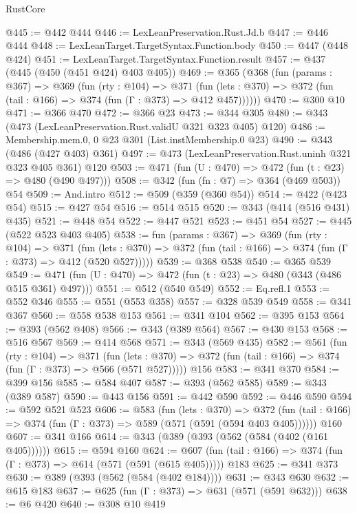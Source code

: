 \begin{lexlean}{RustCore}
\begin{coremodule}
@445 := @442 @444
@446 := LexLeanPreservation.Rust.Jd.b
@447 := @446 @444
@448 := LexLeanTarget.TargetSyntax.Function.body
@450 := @447 (@448 @424)
@451 := LexLeanTarget.TargetSyntax.Function.result
@457 := @437 (@445 (@450 (@451 @424) @403 @405))
@469 := @365
    (@368
      (fun (params : @367) =>
      @369
        (fun (rty : @104) =>
        @371
          (fun (lets : @370) => @372 (fun (tail : @166) => @374 (fun (Γ : @373) => @412 @457))))))
@470 := @300 @10
@471 := @366 @470
@472 := @366 @23
@473 := @344 @305
@480 := @343 (@473 (LexLeanPreservation.Rust.validU @321 @323 @405) @120)
@486 := Membership.mem.{0, 0} @23 @301 (List.instMembership.{0} @23)
@490 := @343 (@486 (@427 @403) @361)
@497 := @473 (LexLeanPreservation.Rust.uninh @321 @323 @405 @361) @120
@503 := @471 (fun (U : @470) => @472 (fun (t : @23) => @480 (@490 @497)))
@508 := @342 (fun (fn : @7) => @364 (@469 @503)) @54
@509 := And.intro
@512 := @509 (@359 (@360 @54))
@514 := @422 (@423 @54)
@515 := @427 @54
@516 := @514 @515
@520 := @343 (@414 (@516 @431) @435)
@521 := @448 @54
@522 := @447 @521
@523 := @451 @54
@527 := @445 (@522 @523 @403 @405)
@538 := fun (params : @367) =>
  @369
    (fun (rty : @104) =>
    @371
      (fun (lets : @370) => @372 (fun (tail : @166) => @374 (fun (Γ : @373) => @412 (@520 @527)))))
@539 := @368 @538
@540 := @365 @539
@549 := @471 (fun (U : @470) => @472 (fun (t : @23) => @480 (@343 (@486 @515 @361) @497)))
@551 := @512 (@540 @549)
@552 := Eq.refl.{1}
@553 := @552 @346
@555 := @551 (@553 @358)
@557 := @328 @539 @549
@558 := @341 @367
@560 := @558 @538 @153
@561 := @341 @104
@562 := @395 @153
@564 := @393 (@562 @408)
@566 := @343 (@389 @564)
@567 := @430 @153
@568 := @516 @567
@569 := @414 @568
@571 := @343 (@569 @435)
@582 := @561
    (fun (rty : @104) =>
    @371
      (fun (lets : @370) => @372 (fun (tail : @166) => @374 (fun (Γ : @373) => @566 (@571 @527)))))
    @156
@583 := @341 @370
@584 := @399 @156
@585 := @584 @407
@587 := @393 (@562 @585)
@589 := @343 (@389 @587)
@590 := @443 @156
@591 := @442 @590
@592 := @446 @590
@594 := @592 @521 @523
@606 := @583
    (fun (lets : @370) =>
    @372 (fun (tail : @166) => @374 (fun (Γ : @373) => @589 (@571 (@591 (@594 @403 @405))))))
    @160
@607 := @341 @166
@614 := @343 (@389 (@393 (@562 (@584 (@402 (@161 @405))))))
@615 := @594 @160
@624 := @607 (fun (tail : @166) => @374 (fun (Γ : @373) => @614 (@571 (@591 (@615 @405))))) @183
@625 := @341 @373
@630 := @389 (@393 (@562 (@584 (@402 @184))))
@631 := @343 @630
@632 := @615 @183
@637 := @625 (fun (Γ : @373) => @631 (@571 (@591 @632)))
@638 := @6 @420
@640 := @308 @10 @419

\end{coremodule}
\end{lexlean}
